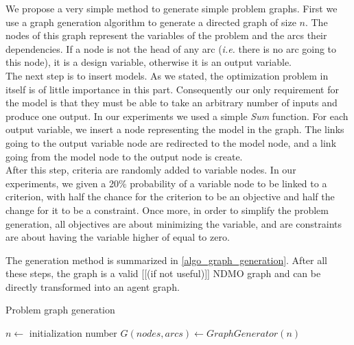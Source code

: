 We propose a very simple method to generate simple problem graphs. First we use a graph generation algorithm to generate a directed graph of size $n$. The nodes of this graph represent the variables of the problem and the arcs their dependencies. If a node is not the head of any arc (\emph{i.e.} there is no arc going to this node), it is a design variable, otherwise it is an output variable.\\
The next step is to insert models. As we stated, the optimization problem in itself is of little importance in this part. Consequently our only requirement for the model is that they must be able to take an arbitrary number of inputs and produce one output. In our experiments we used a simple \emph{Sum} function. For each output variable, we insert a node representing the model in the graph. The links going to the output variable node are redirected to the model node, and a link going from the model node to the output node is create.\\
After this step, criteria are randomly added to variable nodes. In our experiments, we given a 20\% probability of a variable node  to be linked to a criterion, with half the chance for the criterion to be an objective and half the change for it to be a constraint. Once more, in order to simplify the problem generation, all objectives are about minimizing the variable, and are constraints are about having the variable higher of equal to zero.

The generation method is summarized in \ref{algo_graph_generation}. After all these steps, the graph is a valid [[(if not useful)]] NDMO graph and can be directly transformed into an agent graph.

\begin{algorithm}
\caption{Problem graph generation}
\label{algo_graph_generation}
	$n \leftarrow$ initialization number
	$G(nodes, arcs) \leftarrow GraphGenerator(n)$\;
			

\end{algorithm}

